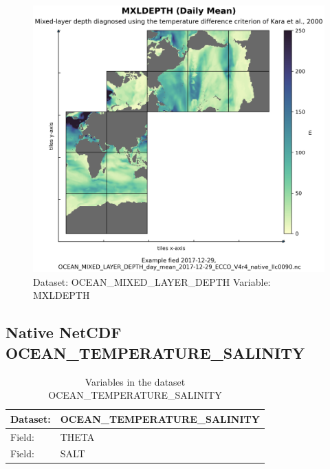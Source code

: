 \begin{figure}[H]
\centering
\includegraphics[width=\textwidth]{../images/plots/native_plots/Ocean_Mixed_Layer_Depth/MXLDEPTH.png}
\caption{Dataset: OCEAN\_MIXED\_LAYER\_DEPTH Variable: MXLDEPTH}
\label{tab:table-OCEAN_MIXED_LAYER_DEPTH_MXLDEPTH-Plot}
\end{figure}
\pagebreak
\subsection{Native NetCDF OCEAN\_TEMPERATURE\_SALINITY}
\newp
\begin{longtable}{|p{}|p{}|}
\caption{Variables in the dataset OCEAN\_TEMPERATURE\_SALINITY}
\label{tab:table-OCEAN_TEMPERATURE_SALINITY-fields} \\ 
\hline \endhead \hline \endfoot
\rowcolor{lightgray} \textbf{Dataset:} & \textbf{OCEAN\_TEMPERATURE\_SALINITY} \\ \hline
Field: &THETA \\ \hline
Field: &SALT \\ \hline
\end{longtable}

\pagebreak
